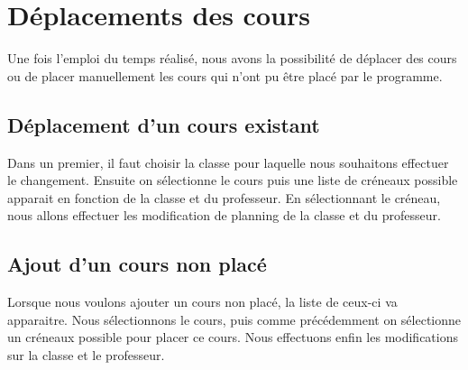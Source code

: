 \section{Déplacements des cours}

Une fois l'emploi du temps réalisé, nous avons la possibilité de déplacer des cours ou de placer manuellement les cours qui n'ont pu être placé par le programme.

\subsection {Déplacement d'un cours existant}

Dans un premier, il faut choisir la classe pour laquelle nous souhaitons effectuer le changement. Ensuite on sélectionne le cours puis une liste de créneaux possible apparait en fonction de la classe et du professeur. En sélectionnant le créneau, nous allons effectuer les modification de planning de la classe et du professeur.

\subsection {Ajout d'un cours non placé}

Lorsque nous voulons ajouter un cours non placé, la liste de ceux-ci va apparaitre. Nous sélectionnons le cours, puis comme précédemment on sélectionne un créneaux possible pour placer ce cours. Nous effectuons enfin les modifications sur la classe et le professeur.